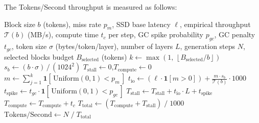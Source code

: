 \documentclass[conference]{IEEEtran}
\begin{document}
        The Tokens/Second throughput is measured as follows:
        \begin{algorithm}[htbp]
        \caption{Tokens/Second Throughput Simulation}
            \begin{algorithmic}[1]
                \Require Block size $b$ (tokens), miss rate $p_m$, SSD base latency $\ell$,
                        empirical throughput $\mathcal{T}(b)$ (MB/s), compute time $t_c$ per step,
                        GC spike probability $p_{gc}$, GC penalty $t_{gc}$, token size $\sigma$ (bytes/token/layer),
                        number of layers $L$, generation steps $N$, selected blocks budget $B_{\text{selected}}$ (tokens)
                \State $k \leftarrow \max\!\left(1,\, \left\lfloor B_{\text{selected}} / b \right\rfloor\right)$
                \State $s_b \leftarrow (b \cdot \sigma)\,/\,(1024^2)$
                \State $T_{\text{stall}} \leftarrow 0$,\quad $T_{\text{compute}} \leftarrow 0$
                    \State $m \leftarrow \sum_{j=1}^{k} \mathbf{1}[\,\text{Uniform}(0,1) < p_m\,]$
                    \State $t_{\text{io}} \leftarrow \left(\ell \cdot \mathbf{1}[m > 0]\right) + \frac{m \cdot s_b}{\mathcal{T}(b)} \cdot 1000$
                    \State $t_{\text{spike}} \leftarrow t_{gc} \cdot \mathbf{1}[\,\text{Uniform}(0,1) < p_{gc}\,]$
                    \State $T_{\text{stall}} \leftarrow T_{\text{stall}} + t_{\text{io}} \cdot L + t_{\text{spike}}$
                    \State $T_{\text{compute}} \leftarrow T_{\text{compute}} + t_c$
                \EndFor
                \State $T_{\text{total}} \leftarrow (T_{\text{compute}} + T_{\text{stall}}) \;/\; 1000$
                \State \Return $\text{Tokens/Second} \leftarrow N \;/\; T_{\text{total}}$
            \end{algorithmic}
        \end{algorithm}
\end{document}
